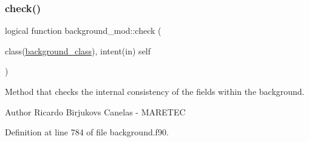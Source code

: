 \subsubsection{\texorpdfstring{check()}{check()}}
{\footnotesize\ttfamily logical function background\+\_\+mod\+::check (\begin{DoxyParamCaption}\item[{class(\mbox{\hyperlink{structbackground__mod_1_1background__class}{background\+\_\+class}}), intent(in)}]{self }\end{DoxyParamCaption})\hspace{0.3cm}{\ttfamily [private]}}



Method that checks the internal consistency of the fields within the background. 

\begin{DoxyAuthor}{Author}
Ricardo Birjukovs Canelas -\/ M\+A\+R\+E\+T\+EC 
\end{DoxyAuthor}


Definition at line 784 of file background.\+f90.


